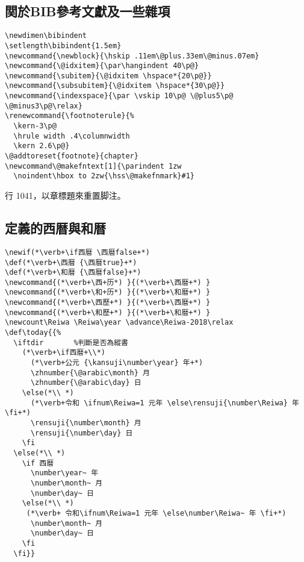 \subsection{関於BIB參考文獻及一些雜項}

\begin{lstlisting}[firstnumber=1052]
\newdimen\bibindent
\setlength\bibindent{1.5em}
\newcommand{\newblock}{\hskip .11em\@plus.33em\@minus.07em}
\newcommand{\@idxitem}{\par\hangindent 40\p@}
\newcommand{\subitem}{\@idxitem \hspace*{20\p@}}
\newcommand{\subsubitem}{\@idxitem \hspace*{30\p@}}
\newcommand{\indexspace}{\par \vskip 10\p@ \@plus5\p@ \@minus3\p@\relax}
\renewcommand{\footnoterule}{%
  \kern-3\p@
  \hrule width .4\columnwidth
  \kern 2.6\p@}
\@addtoreset{footnote}{chapter}
\newcommand\@makefntext[1]{\parindent 1zw
  \noindent\hbox to 2zw{\hss\@makefnmark}#1}
\end{lstlisting}

\par 行 1041，以章標題來重置脚注。


\subsection{定義的西暦與和暦}

\begin{lstlisting}[firstnumber=1068]
\newif(*\verb+\if西暦 \西暦false+*)
\def(*\verb+\西暦 {\西暦true}+*)
\def(*\verb+\和暦 {\西暦false}+*)
\newcommand{(*\verb+\西+历*) }{(*\verb+\西暦+*) }
\newcommand{(*\verb+\和+历*) }{(*\verb+\和暦+*) }
\newcommand{(*\verb+\西歷+*) }{(*\verb+\西暦+*) }
\newcommand{(*\verb+\和歷+*) }{(*\verb+\和暦+*) }
\newcount\Reiwa \Reiwa\year \advance\Reiwa-2018\relax
\def\today{{%
  \iftdir		%判斷是否為縱書
    (*\verb+\if西暦+\\*)
      (*\verb+公元 {\kansuji\number\year} 年+*)
      \zhnumber{\@arabic\month} 月
      \zhnumber{\@arabic\day} 日
    \else(*\\ *)
      (*\verb+令和 \ifnum\Reiwa=1 元年 \else\rensuji{\number\Reiwa} 年 \fi+*)
      \rensuji{\number\month} 月
      \rensuji{\number\day} 日
    \fi
  \else(*\\ *)
    \if 西暦
      \number\year~ 年
      \number\month~ 月
      \number\day~ 日
    \else(*\\ *)
     (*\verb+ 令和\ifnum\Reiwa=1 元年 \else\number\Reiwa~ 年 \fi+*)
      \number\month~ 月
      \number\day~ 日
    \fi
  \fi}}
\end{lstlisting}

